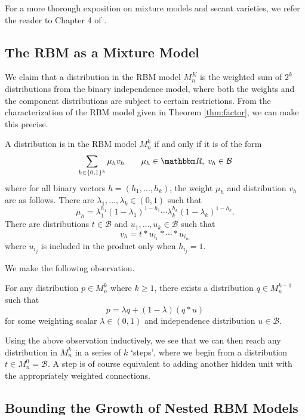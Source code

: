 \documentclass[11pt,titlepage]{article}
\newcommand*{\Bin}{\mathcal{B}}
\numberwithin{equation}{section}
\begin{document}
    For a more thorough exposition on mixture models and secant varieties, we
    refer the reader to Chapter 4 of \cite{DSS08}.

\subsection{The RBM as a Mixture Model}

    We claim that a distribution in the RBM model $M_n^K$ is the weighted sum of
    $2^k$ distributions from the binary independence model, where both the
    weights and the component distributions are subject to certain restrictions.
    From the characterization of the RBM model given in Theorem
    \ref{thm:factor}, we can make this precise.
    \begin{proposition}
    A distribution is in the RBM model $M_n^k$ if and only if it is of the form
    \[
        \sum_{h \in \{0,1\}^k} \mu_h v_h
        \qquad
        \mu_h \in \R, \;
        v_h \in \Bin
    \]
    where for all binary vectors $h = (h_1, \ldots, h_k)$, the weight $\mu_h$
    and distribution $v_h$ are as follows.  There are $\lambda_1, \ldots,
    \lambda_k \in (0,1)$ such that
    \[
        \mu_h = \lambda_1^{h_1}(1 - \lambda_1)^{1-h_1} \cdots
        \lambda_k^{h_k}(1-\lambda_k)^{1-h_k}.
    \]
    There are distributions $t \in \Bin$ and $u_1, \ldots, u_k \in \Bin$ such
    that
    \[
        v_h = t * u_{i_1} * \cdots * u_{i_m}
    \]
    where $u_{i_j}$ is included in the product only when $h_{i_j} = 1$.
    \end{proposition}

    We make the following observation.
    \begin{proposition}
        For any distribution $p \in M_n^k$ where $k \ge 1$, there exists a
        distribution $q \in M_n^{k-1}$ such that
        \[
            p = \lambda q + (1 - \lambda)(q * u)
        \]
        for some weighting scalar $\lambda \in (0,1)$ and independence
        distribution $u \in \Bin$.
    \end{proposition}
    Using the above observation inductively, we see that we can then reach any
    distribution in $M_n^k$ in a series of $k$ `steps', where we begin from a
    distribution $t \in M_n^0 = \Bin$.  A step is of course equivalent to
    adding another hidden unit with the appropriately weighted connections.

\subsection{Bounding the Growth of Nested RBM Models}
\end{document}
